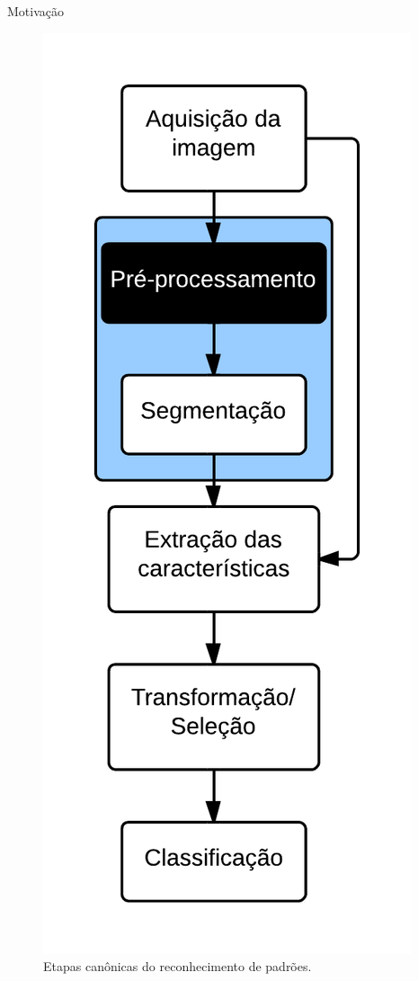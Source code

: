\documentclass[10pt]{beamer}
\begin{document}
\begin{frame}[plain]{Motivação}
  \setlength\leftmargini{1em}
  \begin{figure}
    \includegraphics[height=0.9\textheight]{figuras/flow.png}
    \caption{Etapas canônicas do reconhecimento de padrões.}
  \end{figure}
\end{frame}
\end{document}

